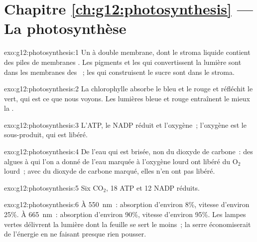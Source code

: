 \section*{Chapitre \ref{ch:g12:photosynthesis} --- La photosynthèse}

\begin{solution}{exo:g12:photosynthesis:1}
Un  à double membrane, dont le stroma liquide contient des
piles de membranes . Les pigments et les  qui
convertissent la lumière sont dans les membranes des ~; les
 qui construisent le sucre sont dans le stroma.
\end{solution}

\begin{solution}{exo:g12:photosynthesis:2}
La chlorophylle absorbe le bleu et le rouge et réfléchit le vert, qui
est ce que nous voyons. Les lumières bleue et rouge entraînent le
mieux la .
\end{solution}

\begin{solution}{exo:g12:photosynthesis:3}
L'ATP, le NADP réduit et l'oxygène~; l'oxygène est le sous-produit,
qui est libéré.
\end{solution}

\begin{solution}{exo:g12:photosynthesis:4}
De l'eau qui est brisée, non du dioxyde de carbone~: des algues à qui
l'on a donné de l'eau marquée à l'oxygène lourd ont libéré du
$\mathrm{O_2}$ lourd~; avec du dioxyde de carbone marqué, elles n'en
ont pas libéré.
\end{solution}

\begin{solution}{exo:g12:photosynthesis:5}
Six $\mathrm{CO_2}$, 18 ATP et 12 NADP réduits.
\end{solution}

\begin{solution}{exo:g12:photosynthesis:6}
À \qty{550}{nm}~: absorption d'environ 8\%, vitesse d'environ 25\%. À
\qty{665}{nm}~: absorption d'environ 90\%, vitesse d'environ 95\%. Les
lampes vertes délivrent la lumière dont la feuille se sert le moins~;
la serre économiserait de l'énergie en ne faisant presque rien
pousser.
\end{solution}

